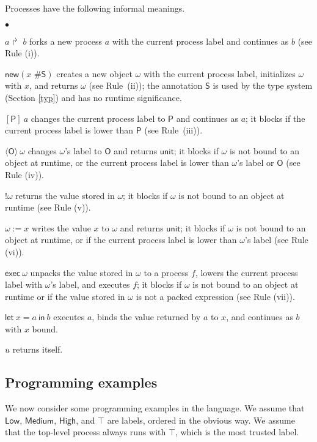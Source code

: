\documentclass{sigplanconf}
\newcommand{\labp}{\mathsf P}
\newcommand{\labo}{\mathsf O}
\newcommand{\labb}{\mathsf S}
\newcommand{\fork}[2]{#1\Rsh\:\!#2}
\newcommand{\eval}[3]{\mathsf{let}~#1=#2~\mathsf{in}~#3}
\newenvironment{compact}
        {\begin{list}{$\bullet$}{
}}
        {\end{list}}
\begin{document}
Processes have the following informal meanings. 
\begin{compact}
\item $\fork a b$ forks a new process $a$ with the current process label and continues as $b$ (see Rule (i)).
\item $\mathsf{new}(x\mbox{ \# }\labb)$ creates a new object $\omega$ with the current process label,  initializes $\omega$ with $x$, and returns $\omega$ (see Rule~(ii)); the annotation $\labb$ is used by the type system (Section \ref{typ}) and has no runtime significance. 
\item $[\labp]~a$ changes the current process label to $\labp$ and
  continues as
  $a$; it blocks if the current process label is lower than $\labp$ (see Rule~(iii)).
\item $\langle\labo\rangle~\omega$ changes $\omega$'s label to $\labo$ and returns $\mathsf{unit}$; it
  blocks if  $\omega$ is not bound to an object at runtime, or the current process label is lower than $\omega$'s label or $\labo$ (see Rule (iv)).
\item $!\omega$ returns the value stored in $\omega$; it blocks if
  $\omega$ is not bound to an object at runtime (see Rule (v)).
\item $\omega := x$ writes the value $x$ to $\omega$ and returns $\mathsf{unit}$; it blocks if
  $\omega$ is not bound to an object at runtime, or if the current process label is lower than $\omega$'s label (see Rule (vi)).
\item $\mathsf{exec}~\omega$ unpacks the value stored in $\omega$ to a
  process $f$, lowers the current process label with $\omega$'s label, and executes
  $f$; it blocks if $\omega$ is not bound to an object
 at runtime or if the value stored in $\omega$ is not a packed expression (see Rule (vii)).
\item $\eval x a b$ executes $a$, binds the value returned by $a$ to $x$, and
  continues as
  $b$ with $x$ bound.
\item $u$ returns itself.
\end{compact}


\subsection{Programming examples}


We now consider some programming examples in the language. We assume that $\mathsf{Low}$, $\mathsf{Medium}$, $\mathsf{High}$, and $\top$ are labels, ordered in the obvious way. We assume that the top-level process always runs with $\top$, which is the most trusted label. 
\end{document}
